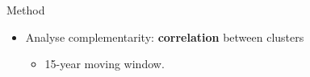\documentclass{beamer}%
\begin{document}
\begin{frame}[fragile]{Method}
   \begin{itemize}
    \item[] Analyse complementarity: \textbf{\alert{correlation}} between clusters
     \begin{itemize}
     \item 15-year moving window.
     \end{itemize}
\end{itemize}
\end{frame}
\end{document}
